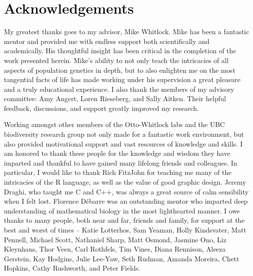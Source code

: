 \chapter*{Acknowledgements}

My greatest thanks goes to my advisor, Mike Whitlock. Mike has been a fantastic mentor and provided me with endless support both scientifically and academically. His thoughtful insight has been critical in the completion of the work presented herein. Mike's ability to not only teach the intricacies of all aspects of population genetics in depth, but to also enlighten me on the most tangential facts of life has made working under his supervision a great pleasure and a truly educational experience. I also thank the members of my advisory committee: Amy Angert, Loren Rieseberg, and Sally Aitken. Their helpful feedback, discussions, and support greatly improved my research.

Working amongst other members of the Otto-Whitlock labs and the UBC biodiversity research group not only made for a fantastic work environment, but also provided motivational support and vast resources of knowledge and skills. I am honored to thank these people for the knowledge and wisdom they have imparted and thankful to have gained many lifelong friends and colleagues. In particular, I would like to thank Rich FitzJohn for teaching me many of the intricacies of the R language, as well as the value of good graphic design. Jeremy Draghi, who taught me C and C++, was always a great source of calm sensibility when I felt lost. Florence D\'ebarre was an outstanding mentor who imparted deep understanding of mathematical biology in the most lighthearted manner. I owe thanks to many people, both near and far, friends and family, for support at the best and worst of times -- Katie Lotterhos, Sam Yeaman, Holly Kindsvater, Matt Pennell, Michael Scott, Nathaniel Sharp, Matt Osmond, Jasmine Ono, Liz Kleynhans, Thor Veen, Carl Rothfels, Tim Vines, Diana Rennison, Aleeza Gerstein, Kay Hodgins, Julie Lee-Yaw, Seth Rudman, Amanda Moreira, Chett Hopkins, Cathy Rushworth, and Peter Fields.

